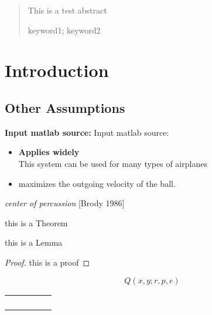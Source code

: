 
  \begin{abstract}
    This is a test abstract
    \begin{keywords}
    keyword1; keyword2
    \end{keywords}
  \end{abstract}

\maketitle

\section{Introduction}

\subsection{Other Assumptions}

\textbf{\textcolor[rgb]{0.98,0.00,0.00}{Input matlab source:}}
\textcolor[rgb]{0.98,0.00,0.00}{Input matlab source:}
\begin{itemize}
  \item \textbf{Applies widely}\\
  This  system can be used for many types of airplanes
  \item maximizes the outgoing velocity of the ball.
\end{itemize}

\emph{center of percussion} [Brody 1986]

\begin{Theorem} \label{thm:latex}
this is a Theorem
\end{Theorem}

\begin{Lemma} \label{lem:tex}
this is a Lemma
\end{Lemma}

\begin{proof}
this is a proof
\end{proof}

\begin{equation}
Q(x,y;r,p,e)
\end{equation}
  

\begin{table}[]
  \begin{tabular}{lllll}
   &  &  &  &  \\
   &  &  &  &  \\
   &  &  &  &  \\
   &  &  &  & 
  \end{tabular}
\end{table}

